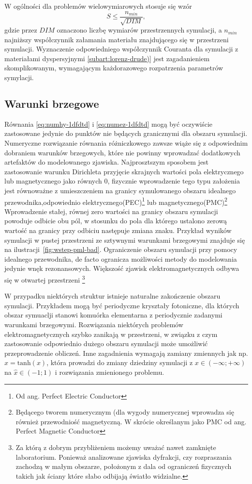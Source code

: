 W ogólności dla problemów wielowymiarowych stosuje się wzór
\begin{equation}
S\le\frac{n_{min}}{\sqrt{DIM}},
\label{eq:courant}
\end{equation}
gdzie przez $DIM$ oznaczono liczbę wymiarów przestrzennych symulacji, a $n_{min}$ najniższy współczynnik załamania materiału znajdującego się w przestrzeni symulacji. Wyznaczenie odpowiedniego współczynnik Couranta dla symulacji z materiałami dyspersyjnymi \ref{subart:lorenz-drude)} jest zagadanieniem skomplikowanym, wymagającym każdorazowego rozpatrzenia parametrów symylacji.

\subsection{Warunki brzegowe}
Równania \ref{eq:numhy-1dfdtd} i \ref{eq:numez-1dfdtd} mogą być oczywiście zastosowane jedynie do punktów nie będących granicznymi dla obszaru symulacji. Numeryczne rozwiązanie równania różniczkowego zawsze wiąże się z odpowiednim dobraniem warunków brzegowych, które nie powinny wprowadzać dodatkowych artefaktów do modelowanego zjawiska. Najprosztszym sposobem jest zastosowanie warunku Dirichleta przyjęcie skrajnych wartości pola elektrycznego lub magnetycznego jako równych 0, fizycznie wprowadzenie tego typu założenia jest równoważne z umieszczeniem na granicy symulowanego obszaru idealnego przewodnika,odpowiednio elektrycznego(PEC)\footnote{Od ang. Perfect Electric Conductor} lub magnetycznego(PMC)\footnote{Będącego tworem numerycznym (dla wygody numerycznej wprowadza się również przewodniość magnetyczną. W skrócie określanym jako PMC od ang. Perfect Magnetic Conductor} Wprowadzenie stałej, równej zero wartości na granicy obszaru symulacji powoduje odbicie obu pól, w stosunku do pola dla którego ustalono zerową wartość na granicy przy odbiciu następuje zmiana znaku. Przykład wyników symulacji w pustej przestrzeni ze sztywnymi warunkami brzegowymi znajduje się na ilustracji~\ref{fig:wstep-pml-bad}. Ograniczenie obszaru symulacji przy pomocy idealnego przewodnika, de facto ogranicza możliwości metody do modelowania jedynie wnęk rezonansowych. Większość zjawisk elektromagnetycznych odbywa się w otwartej przestrzeni \footnote{Za którą z dobrym przybliżeniem możemy uważać nawet zamknięte laboratorium. Ponieważ analizowane zjawiska dyfrakcji, czy rozpraszania zachodzą w małym obszarze, położonym z dala od ograniczeń fizycznych takich jak ściany które słabo odbijają światło widzialne.}

W przypadku niektórych struktur istnieje naturalne zakończenie obszaru symulacji. Przykładem mogą być periodyczne kryształy fotoniczne, dla których obszar symuaclji stanowi komuórka elementarna z periodycznie zadanymi warunkami brzegowymi. Rozwiązania niektórych problemów elektromagnetycznych szybko zanikają w przestrzeni, w związku z czym zastosowanie odpowiednio dużego obszaru symulacji może umożliwić przeprowadzenie obliczeń. Inne zagadnienia wymagają zamiany zmiennych  jak np. $\hat{x}=\textrm{tanh}(x)$, która prowadzi do zmiany dziedziny symulacji z $x\in(- \infty; + \infty)$ na $\hat{x}\in(-1;1)$ i rozwiązania zmienionego problemu. 

